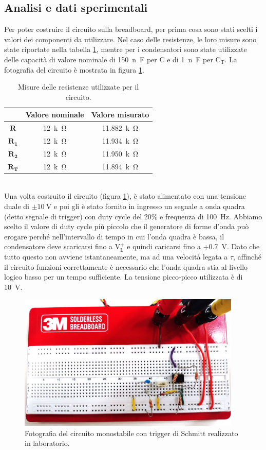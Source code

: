 \documentclass{report}
\begin{document}
\subsection{Analisi e dati sperimentali}
Per poter costruire il circuito sulla breadboard, per prima cosa sono stati scelti i valori dei componenti da utilizzare. Nel caso delle resistenze, le loro misure sono state riportate nella tabella \ref{table:mis_res1}, mentre per i condensatori sono state utilizzate delle capacità di valore nominale di \SI{150}{n\farad} per C e di \SI{1}{n\farad} per $\mathrm{C_T}$. La fotografia del circuito è mostrata in figura \ref{figura:circuito1}.
\begin{table}[h!]
	\centering
	\begin{tabular}{|c|c|c|}
		\cline{2-3} 
		\multicolumn{1}{c|}{} & \textbf{Valore nominale} & \textbf{Valore misurato}\\ 
		\hline
		$\mathbf{R}$ & \SI{12}{k\ohm} & \SI{11.882}{k\ohm} \\ 
		\hline
		$\mathbf{R_1}$ & \SI{12}{k\ohm} & \SI{11.934}{k\ohm} \\ 
		\hline
		$\mathbf{R_2}$ & \SI{12}{k\ohm} & \SI{11.950}{k\ohm} \\ 
		\hline
		$\mathbf{R_T}$ & \SI{12}{k\ohm} & \SI{11.894}{k\ohm} \\ 
		\hline
	\end{tabular}
	\caption{Misure delle resistenze utilizzate per il circuito.}
	\label{table:mis_res1}
\end{table}
\\Una volta costruito il circuito (figura \ref{figura:circuito1}), è stato alimentato con una tensione duale di $\mathrm{\pm\SI{10}{\volt}}$ e poi gli è stato fornito in ingresso un segnale a onda quadra (detto segnale di trigger) con duty cycle del 20\% e frequenza di \SI{100}{\hertz}. Abbiamo scelto il valore di duty cycle più piccolo che il generatore di forme d'onda può erogare perché nell'intervallo di tempo in cui l'onda quadra è bassa, il condensatore deve scaricarsi fino a $\mathrm{V_L^+}$ e quindi caricarsi fino a +\SI{0.7}{\volt}. Dato che tutto questo non avviene istantaneamente, ma ad una velocità legata a $\tau$, affinché il circuito funzioni correttamente è necessario che l'onda quadra stia al livello logico basso per un tempo sufficiente. La tensione picco-picco utilizzata è di \SI{10}{\volt}.\\
\begin{figure}[h!]
	\centering
	\includegraphics[height=6.5cm]{immagini/circuito1}
	\caption{Fotografia del circuito monostabile con trigger di Schmitt realizzato in laboratorio.}
	\label{figura:circuito1}
\end{figure}
\end{document}
